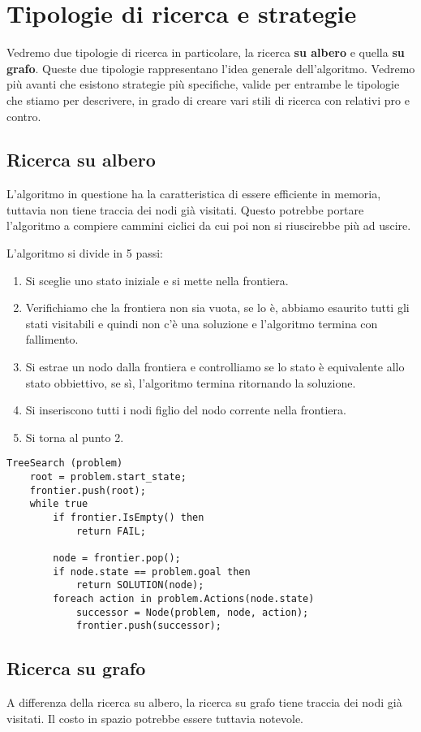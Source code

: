 \section{Tipologie di ricerca e strategie}
Vedremo due tipologie di ricerca in particolare, la ricerca \textbf{su albero} e quella
\textbf{su grafo}. Queste due tipologie rappresentano l'idea generale dell'algoritmo. Vedremo pi\`u
avanti che esistono strategie pi\`u specifiche, valide per entrambe le tipologie che stiamo per
descrivere, in grado di creare vari stili di ricerca con relativi pro e contro.

\subsection{Ricerca su albero}
L'algoritmo in questione ha la caratteristica di essere efficiente in memoria, tuttavia
non tiene traccia dei nodi gi\`a visitati. Questo potrebbe portare l'algoritmo a compiere
cammini ciclici da cui poi non si riuscirebbe pi\`u ad uscire.

L'algoritmo si divide in 5 passi:
\begin{enumerate}
	\item Si sceglie uno stato iniziale e si mette nella frontiera.
	\item Verifichiamo che la frontiera non sia vuota, se lo \`e, abbiamo esaurito tutti gli
	      stati visitabili e quindi non c'\`e una soluzione e l'algoritmo termina con
	      fallimento.
	\item Si estrae un nodo dalla frontiera e controlliamo se lo stato \`e equivalente allo
	      stato obbiettivo, se s\`i, l'algoritmo termina ritornando la soluzione.
	\item Si inseriscono tutti i nodi figlio del nodo corrente nella frontiera.
	\item Si torna al punto 2.
\end{enumerate}

\begin{lstlisting}[style=pseudo-style]
TreeSearch (problem)
	root = problem.start_state;
	frontier.push(root);
	while true
		if frontier.IsEmpty() then
			return FAIL;

		node = frontier.pop();
		if node.state == problem.goal then
			return SOLUTION(node);
		foreach action in problem.Actions(node.state)
			successor = Node(problem, node, action);
			frontier.push(successor);
\end{lstlisting}

\subsection{Ricerca su grafo}
A differenza della ricerca su albero, la ricerca su grafo tiene traccia dei nodi gi\`a
visitati. Il costo in spazio potrebbe essere tuttavia notevole.

